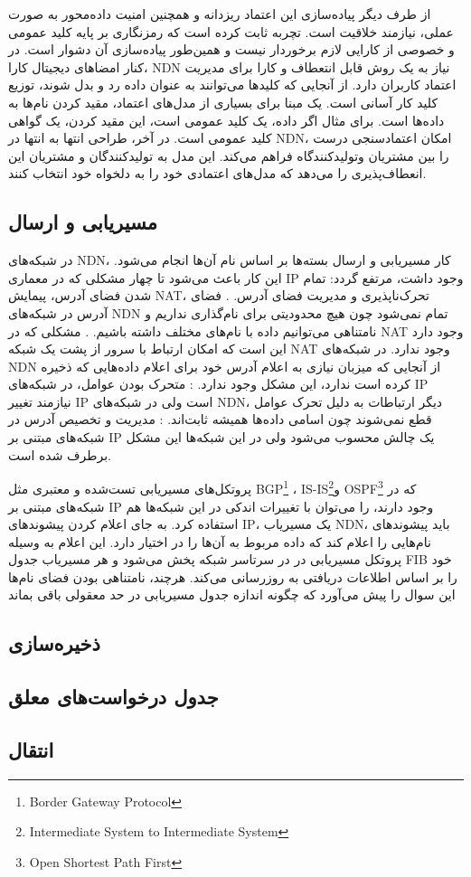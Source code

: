  از طرف دیگر پیاده‌سازی این اعتماد ریزدانه و همچنین امنیت داده‌محور به صورت عملی، نیازمند خلاقیت است.  تچربه ثابت کرده است که رمزنگاری بر پایه کلید عمومی و خصوصی از کارایی لازم برخوردار نیست و همین‌طور پیاده‌سازی آن دشوار است. در کنار امضاهای دیجیتال کارا، NDN نیاز به یک روش قابل انتعطاف و کارا برای مدیریت اعتماد کاربران دارد. از‌ آنجایی که کلیدها می‌توانند به عنوان داده رد و بدل شوند، توزیع کلید کار آسانی است. 
یک مبنا برای بسیاری از مدل‌های اعتماد، مقید کردن نام‌ها به داده‌ها  است. برای مثال اگر داده، یک کلید عمومی است،  این مقید کردن، یک گواهی کلید عمومی است. در آخر، طراحی انتها به انتها در NDN، امکان اعتمادسنجی درست را بین مشتریان وتولیدکنندگاه فراهم می‌کند. این مدل به تولیدکنندگان و مشتریان این انعطاف‌پذیری را می‌دهد که مدل‌های اعتمادی خود را به دلخواه خود انتخاب کنند. 


\subsection{مسیریابی و ارسال}
در شبکه‌های NDN، کار مسیریابی و ارسال بسته‌ها بر اساس نام آن‌ها انجام می‌شود. این کار باعث می‌شود تا چهار مشکلی که در معماری IP وجود داشت، مرتفع گردد:‌ تمام شدن فضای آدرس، پیمایش NAT، تحرک‌ناپذیری و مدیریت فضای آدرس. 
 . فضای آدرس در شبکه‌های NDN تمام نمی‌شود چون هیچ محدودیتی برای نام‌گذاری نداریم و نامتناهی می‌توانیم داده با نام‌های مختلف داشته باشیم. 
 . مشکلی که در NAT وجود دارد این است که امکان ارتباط با سرور از پشت یک شبکه NAT وجود ندارد. در شبکه‌های NDN از آنجایی که میزبان نیازی به اعلام آدرس خود برای اعلام داده‌هایی که ذخیره کرده است ندارد، این مشکل وجود ندارد.  
 : متحرک بودن عوامل، در شبکه‌های IP نیازمند تغییر IP است ولی در شبکه‌های NDN، دیگر ارتباطات به دلیل تحرک عوامل قطع نمی‌شوند چون اسامی داده‌ها همیشه ثابت‌اند. 
 :‌ مدیریت و تخصیص آدرس در شبکه‌های مبتنی بر IP یک چالش محسوب می‌شود ولی در این شبکه‌ها این مشکل برطرف شده است. 

پروتکل‌های مسیریابی تست‌شده و معتبری مثل BGP\footnote{Border Gateway Protocol} ،
IS-IS\footnote{Intermediate System to Intermediate System}و 
OSPF\footnote{Open Shortest Path First}
که در شبکه‌های مبتنی بر IP وجود دارند، را می‌توان با تغییرات اندکی در این شبکه‌ها هم استفاده کرد. به جای اعلام کردن پیشوندهای IP، یک مسیریاب NDN، باید پیشوندهای نام‌هایی را اعلام کند که داده مربوط به آن‌ها را در اختیار دارد. 
این اعلام به وسیله پروتکل مسیریابی در در سرتاسر شبکه پخش می‌شود و هر مسیریاب جدول FIB خود را بر اساس اطلاعات دریافتی به روزرسانی می‌کند. هرچند، نامتناهی بودن فضای نام‌ها این سوال را پیش می‌آورد که چگونه اندازه جدول مسیریابی در حد معقولی باقی بماند 
\subsection{ذخیره‌سازی}
\subsection{جدول درخواست‌های معلق}
\subsection{انتقال}
